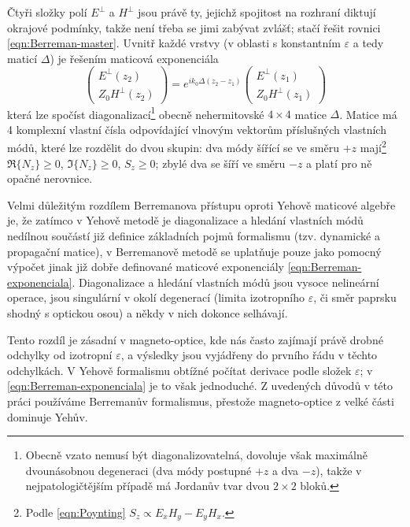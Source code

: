 Čtyři složky polí $E^\perp$ a $H^\perp$ jsou právě ty, jejichž spojitost na rozhraní diktují okrajové podmínky, takže není třeba se jimi zabývat zvlášť; stačí řešit rovnici \eqref{eqn:Berreman-master}.
Uvnitř každé vrstvy (v oblasti s konstantním $\varepsilon$ a tedy maticí $\Delta$) je řešením maticová exponenciála
\begin{equation}
\label{eqn:Berreman-exponenciala}
    \begin{pmatrix} E^\perp(z_2) \\ Z_0 H^\perp(z_2) \end{pmatrix} = e^{ik_0\Delta(z_2-z_1)} \begin{pmatrix} E^\perp(z_1) \\ Z_0 H^\perp(z_1) \end{pmatrix}
\end{equation}
která lze spočíst diagonalizací\footnote{Obecně vzato nemusí být diagonalizovatelná, dovoluje však maximálně dvounásobnou degeneraci (dva módy postupné $+z$ a dva $-z$), takže v nejpatologičtějším případě má Jordanův tvar dvou $2\times2$ bloků.} obecně nehermitovské $4\times 4$ matice $\Delta$.
Matice má 4 komplexní vlastní čísla odpovídající vlnovým vektorům příslušných vlastních módů, které lze rozdělit do dvou skupin:
dva módy šířící se ve směru $+z$ mají\footnote{Podle \eqref{eqn:Poynting} $S_z \propto E_xH_y-E_yH_x$.} $\Re\lbrace N_z \rbrace\geq0$, $\Im\lbrace N_z \rbrace\geq0$, $S_z\geq0$; zbylé dva se šíří ve směru $-z$ a platí pro ně opačné nerovnice.

Velmi důležitým rozdílem Berremanova přístupu oproti Yehově maticové algebře je,
že zatímco v Yehově metodě je diagonalizace a hledání vlastních módů nedílnou součástí již definice základních pojmů formalismu (tzv. dynamické a propagační matice),
v Berremanově metodě se uplatňuje pouze jako pomocný výpočet jinak již dobře definované maticové exponenciály \eqref{eqn:Berreman-exponenciala}.
Diagonalizace a hledání vlastních módů jsou vysoce nelineární operace, jsou singulární v okolí degenerací (limita izotropního $\varepsilon$, či směr paprsku shodný s optickou osou) a někdy v nich dokonce selhávají\todocite{}.

Tento rozdíl je zásadní v magneto-optice, kde nás často zajímají právě drobné odchylky od izotropní $\varepsilon$, a výsledky jsou vyjádřeny do prvního řádu v těchto odchylkách.
V Yehově formalismu obtížné počítat derivace podle složek $\varepsilon$; v \eqref{eqn:Berreman-exponenciala} je to však jednoduché.
Z uvedených důvodů v této práci používáme Berremanův formalismus, přestože magneto-optice z velké části dominuje Yehův.
